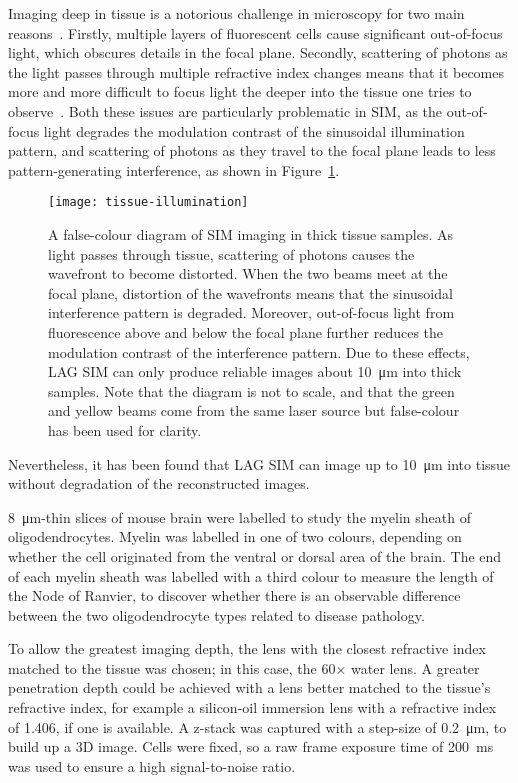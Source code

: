 Imaging deep in tissue is a notorious challenge in microscopy for two main reasons~\cite{wimmer2010high}.
Firstly, multiple layers of fluorescent cells cause significant out-of-focus light, which obscures details in the focal plane.
Secondly, scattering of photons as the light passes through multiple refractive index changes means that it becomes more and more difficult to focus light the deeper into the tissue one tries to observe~\cite{jacques2013optical}.
Both these issues are particularly problematic in SIM, as the out-of-focus light degrades the modulation contrast of the sinusoidal illumination pattern, and scattering of photons as they travel to the focal plane leads to less pattern-generating interference, as shown in Figure~\ref{fig:tissue-illumination}.

\begin{figure}[htbp!]
\centering
\texttt{[image: tissue-illumination]}
\caption[LAG SIM: Imaging in tissue degrades the SIM pattern due to photon scattering and out-of-focus light]{A false-colour diagram of SIM imaging in thick tissue samples.
As light passes through tissue, scattering of photons causes the wavefront to become distorted. When the two beams meet at the focal plane, distortion of the wavefronts means that the sinusoidal interference pattern is degraded. Moreover, out-of-focus light from fluorescence above and below the focal plane further reduces the modulation contrast of the interference pattern. Due to these effects, LAG SIM can only produce reliable images about \SI{10}{\micro\metre} into thick samples. Note that the diagram is not to scale, and that the green and yellow beams come from the same laser source but false-colour has been used for clarity. }
\label{fig:tissue-illumination}
\end{figure}

Nevertheless, it has been found that LAG SIM can image up to \SI{10}{\micro\metre} into tissue without degradation of the reconstructed images.

\SI{8}{\micro\metre}-thin slices of mouse brain were labelled to study the myelin sheath of oligodendrocytes.
Myelin was labelled in one of two colours, depending on whether the cell originated from the ventral or dorsal area of the brain.
The end of each myelin sheath was labelled with a third colour to measure the length of the Node of Ranvier, to discover whether there is an observable difference between the two oligodendrocyte types related to disease pathology.

To allow the greatest imaging depth, the lens with the closest refractive index matched to the tissue was chosen; in this case, the 60$\times$ water lens.
A greater penetration depth could be achieved with a lens better matched to the tissue's refractive index, for example a silicon-oil immersion lens with a refractive index of \num{1.406}, if one is available.
A z-stack was captured with a step-size of \SI{0.2}{\micro\metre}, to build up a 3D image.
Cells were fixed, so a raw frame exposure time of \SI{200}{\milli\second} was used to ensure a high signal-to-noise ratio.


